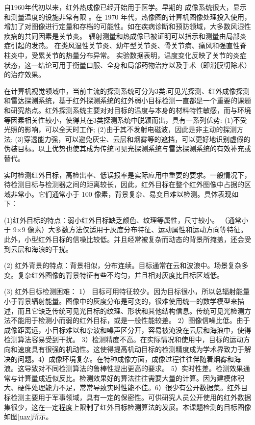 自1960年代初以来，红外热成像已经开始用于医学\cite{ring1975thermography}。早期的
成像系统很大，显示和测量温度的设施非常有限
。在 1970 年代，热像图的计算机图像处理投入使用，增加了对图像进行定量和存档的可能性。如在疾病诊断和预防领域，大多数风湿性疾病的共同因素是关节炎。 辐射测量和热成像已被证明可以指示和测量由局部炎症引起的发热。 在类风湿性关节炎、幼年型关节炎、骨关节病、痛风和强直性脊柱炎中，受累关节的热量分布异常。 实验数据表明，温度变化反映了关节的炎症状态，这一结论可用于衡量口服、全身和局部药物治疗以及手术（即滑膜切除术）的治疗效果。


在计算机视觉领域中，当前主流的探测系统可分为3类:可见光探测、红外成像探测和雷达探测系统，基于红外探测系统的红外弱小目标检测一直都是一个重要的课题和研究热点。红外探测系统主要对对目标的温度与本身的材料特性敏感，而与环境等因素相关性较小，使得其在3类探测系统中脱颖而出，具有一系列优势:
(1)不受光照的影响，可以全天时工作;
(2)由于其不发射电磁波，因此是非主动的探测方法;
(3)穿透能力强，可以避免灰尘、云层和烟雾等的遮挡，可以更好地识别虚假的伪装目标。以上优势也使其成为传统可见光探测系统与雷达探测系统的有效补充或替代。

实时检测红外目标，高检出率、低误报率是实际应用中重要的要求。一般情况下，待检测目标与检测器之间的距离较长，因此，红外目标在整个红外图像中占据的区域非常小。它们通常小于 100 像素，背景复杂、易变且难以检测。具体表现如下：

(1)红外目标的特点：弱小红外目标缺乏颜色、纹理等属性，尺寸较小。 （通常小于 9×9 像素）大多数方法仅适用于灰度分布特征、运动属性和运动方向等特征。此外，小型红外目标的信噪比较低。并且经常被复杂而动态的背景所掩盖，还会受到云层和海浪的干扰。

(2) 红外背景的特点：背景相似，分布连续。目标通常在云和波浪中。场景复杂多变。复杂红外图像的背景特征有些不均匀，并且相对灰度比目标区域低。

(3) 红外目标检测困难： 1） 目标可用特征较少。因为目标很小，所以总辐射能量小于背景辐射能量。图像中的灰度分布是可变的，很难使用统一的数学模型来描述，而且它缺乏传统可见光目标的纹理、形状和其他结构信息。传统可见光检测方法不能用于检测小而弱的红外目标，或是一般性能较差。 2）图像信噪比低。由于成像距离远，小目标难以和杂波和噪声区分开，容易被淹没在云层和海浪中，使得检测算法容易受到干扰。 3）检测精度不高。在实际情况和使用中，目标的运动方向和速度具有很强的机动性。这使得提高机动目标的检测精度成为学术界致力于解决的问题。4）成像环境复杂。在特种成像方面，成像过程往往伴随着烟雾和海浪。这导致对不同检测算法的鲁棒性提出更高的要求。 5）实时性差。检测效果通常与计算量成近似反比。检测效果好的算法往往需要大量的计算。因为建模体积大、硬件处理能力不足，常常导致实时性能不佳。6）很少有公开数据集。红外目标检测主要用于军事领域，具有一定的保密性。可供研究人员公开使用的红外数据集很少，这在一定程度上限制了红外目标检测算法的发展。本课题检测的目标图像如图\ref{uav}所示。

